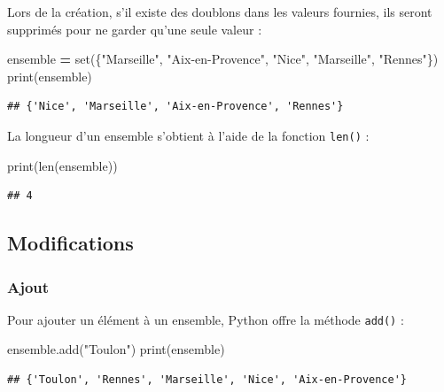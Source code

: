 \documentclass[12pt,]{book}
\newenvironment{Shaded}{\begin{snugshade}}{\end{snugshade}}
\newcommand{\StringTok}[1]{\textcolor[rgb]{0.31,0.60,0.02}{#1}}
\newcommand{\OperatorTok}[1]{\textcolor[rgb]{0.81,0.36,0.00}{\textbf{#1}}}
\newcommand{\BuiltInTok}[1]{#1}
\newcommand{\NormalTok}[1]{#1}
\numberwithin{equation}{section}
\numberwithin{countremarque}{section}
\begin{document}
Lors de la création, s'il existe des doublons dans les valeurs fournies,
ils seront supprimés pour ne garder qu'une seule valeur :

\begin{Shaded}
\begin{Highlighting}[]
\NormalTok{ensemble }\OperatorTok{=} \BuiltInTok{set}\NormalTok{(\{}\StringTok{"Marseille"}\NormalTok{, }\StringTok{"Aix-en-Provence"}\NormalTok{, }\StringTok{"Nice"}\NormalTok{, }\StringTok{"Marseille"}\NormalTok{, }\StringTok{"Rennes"}\NormalTok{\})}
\BuiltInTok{print}\NormalTok{(ensemble)}
\end{Highlighting}
\end{Shaded}

\begin{lstlisting}
## {'Nice', 'Marseille', 'Aix-en-Provence', 'Rennes'}
\end{lstlisting}

La longueur d'un ensemble s'obtient à l'aide de la fonction
\texttt{len()} :

\begin{Shaded}
\begin{Highlighting}[]
\BuiltInTok{print}\NormalTok{(}\BuiltInTok{len}\NormalTok{(ensemble))}
\end{Highlighting}
\end{Shaded}

\begin{lstlisting}
## 4
\end{lstlisting}

\subsection{Modifications}\label{modifications}

\subsubsection{Ajout}\label{ajout}

Pour ajouter un élément à un ensemble, Python offre la méthode
\texttt{add()} :

\begin{Shaded}
\begin{Highlighting}[]
\NormalTok{ensemble.add(}\StringTok{"Toulon"}\NormalTok{)}
\BuiltInTok{print}\NormalTok{(ensemble)}
\end{Highlighting}
\end{Shaded}

\begin{lstlisting}
## {'Toulon', 'Rennes', 'Marseille', 'Nice', 'Aix-en-Provence'}
\end{lstlisting}
\end{document}
